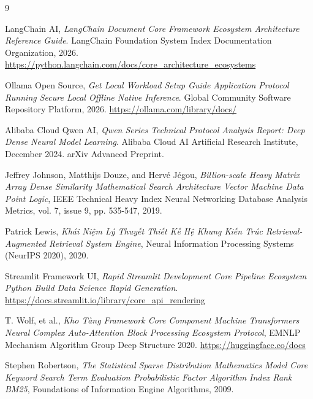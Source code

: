 \documentclass[10pt, conference, a4paper, compsocconf]{IEEEtran}
\begin{document}
\renewcommand{\refname}{Thư Mục Tài liệu Tham Khảo Học Thuật}
\begin{thebibliography}{9}

LangChain AI, \emph{LangChain Document Core Framework Ecosystem Architecture Reference Guide}. LangChain Foundation System Index Documentation Organization, 2026. \url{https://python.langchain.com/docs/core_architecture_ecosystems}

Ollama Open Source, \emph{Get Local Workload Setup Guide Application Protocol Running Secure Local Offline Native Inference}. Global Community Software Repository Platform, 2026. \url{https://ollama.com/library/docs/}

Alibaba Cloud Qwen AI, \emph{Qwen Series Technical Protocol Analysis Report: Deep Dense Neural Model Learning}. Alibaba Cloud AI Artificial Research Institute, December 2024. arXiv Advanced Preprint.

Jeffrey Johnson, Matthijs Douze, and Herv{\'e} J{\'e}gou, \emph{Billion-scale Heavy Matrix Array Dense Similarity Mathematical Search Architecture Vector Machine Data Point Logic}, IEEE Technical Heavy Index Neural Networking Database Analysis Metrics, vol. 7, issue 9, pp. 535-547, 2019.

Patrick Lewis, \emph{Khái Niệm Lý Thuyết Thiết Kế Hệ Khung Kiến Trúc Retrieval-Augmented Retrieval System Engine}, Neural Information Processing Systems (NeurIPS 2020), 2020. 

Streamlit Framework UI, \emph{Rapid Streamlit Development Core Pipeline Ecosystem Python Build Data Science Rapid Generation}. \url{https://docs.streamlit.io/library/core_api_rendering}

T. Wolf, et al., \emph{Kho Tàng Framework Core Component Machine Transformers Neural Complex Auto-Attention Block Processing Ecosystem Protocol}, EMNLP Mechanism Algorithm Group Deep Structure 2020. \url{https://huggingface.co/docs}

Stephen Robertson, \emph{The Statistical Sparse Distribution Mathematics Model Core Keyword Search Term Evaluation Probabilistic Factor Algorithm Index Rank BM25}, Foundations of Information Engine Algorithms, 2009.

\end{thebibliography}
\end{document}
